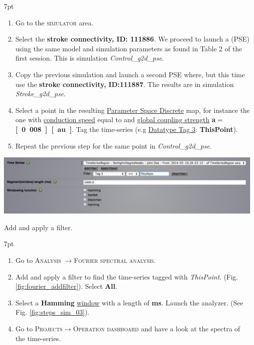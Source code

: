 \documentclass{tufte-handout}
\newenvironment{formal}{%
  \def\FrameCommand{%
    \hspace{1pt}%
    {\color{DarkBlue}\vrule width 2pt}%
    {\color{formalshade}\vrule width 4pt}%
    \colorbox{formalshade}%
  }%
  \MakeFramed{\advance\hsize-\width\FrameRestore}%
  \noindent\hspace{-4.55pt}%
  \begin{adjustwidth}{}{7pt}%
  \vspace{2pt}\vspace{2pt}%
}
{%
  \vspace{2pt}\end{adjustwidth}\endMakeFramed%
}
\newenvironment{simulation}{%
  \def\FrameCommand{%
    \hspace{1pt}%
    {\color{ForestGreen}\vrule width 2pt}%
    {\color{simulationshade}\vrule width 4pt}%
    \colorbox{simulationshade}%
  }%
  \MakeFramed{\advance\hsize-\width\FrameRestore}%
  \noindent\hspace{-4.55pt}%
  \begin{adjustwidth}{}{7pt}%
  \vspace{2pt}\vspace{2pt}%
}
{%
  \vspace{2pt}\end{adjustwidth}\endMakeFramed%
}
\begin{document}
\begin{simulation}
  \begin{enumerate}
  \item Go to the \textsc{simulator} area. 
  \item Select the \textbf{stroke connectivity, ID: 111886}. We proceed to launch a (PSE) using the same model and simulation parameters as found in Table 2 of the first session. This is simulation \textit{Control\_g2d\_pse}.
  \item Copy the previous simulation and launch a second PSE where, but this time use the \textbf{stroke connectivity, ID:111887}. The results are in simulation \textit{Stroke\_g2d\_pse}.
  \item Select a point in the resulting \underline{Parameter Space Discrete} map, for instance the one with \underline{conduction speed} equal to \textbf{} and \underline{global coupling strength} \textbf{a}$\mathbf{=}$\textbf{\unit[0.008][au]}. Tag the time-series (e.g \underline{Datatype Tag 3}: \textbf{ThisPoint}). 
  
 \item Repeat the previous step for the same point in \textit{Control\_g2d\_pse}.
 
  \end{enumerate}
\end{simulation}
 
 \begin{marginfigure}%
  \includegraphics[width=0.82\linewidth]{Handout_UI_ModellingStructuralLesions_FourierAddFilter}
    \caption{Add and apply a filter.}
  \label{fig:fourier_addfilter}
  \end{marginfigure}
 \begin{formal}
  \begin{enumerate}
  \item Go to \textsc{Analysis} $\rightarrow$\textsc{Fourier spectral analysis}. 
  \item Add and apply a filter to find the time-series tagged with \textit{ThisPoint}. (Fig. \ref{fig:fourier_addfilter}). Select \textbf{All}.
  \item Select a \textbf{Hamming} \underline{window} with a length of \textbf{\unit[500]{ms}}.  Launch the analyzer. (See Fig. \ref{fig:steps_sim_03}).
  \item Go to \textsc{Projects}$\rightarrow$\textsc{Operation dashboard} and have a look at the spectra of the time-series.
 \end{enumerate}
\end{formal}
\end{document}
